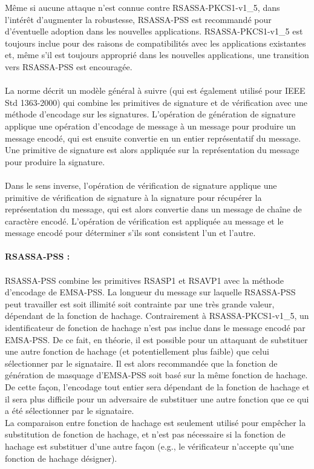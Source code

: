 Même si aucune attaque n'est connue contre RSASSA-PKCS1-v1\_5, dans l'intérêt d'augmenter la robustesse, RSASSA-PSS est recommandé pour d'éventuelle adoption dans les nouvelles applications. RSASSA-PKCS1-v1\_5 est toujours inclue pour des raisons de compatibilités avec les applications existantes et, même s'il est toujours approprié dans les nouvelles applications, une transition vers RSASSA-PSS est encouragée.
\\ \\
La norme décrit un modèle général à suivre (qui est également utilisé pour IEEE Std 1363-2000) qui combine les primitives de signature et de vérification avec une méthode d'encodage sur les signatures. L'opération de génération de signature applique une opération d'encodage de message à un message pour produire un message encodé, qui est ensuite convertie en un entier représentatif du message. Une primitive de signature est alors appliquée sur la représentation du message pour produire la signature.
\\ \\
Dans le sens inverse, l'opération de vérification de signature applique une primitive de vérification de signature à la signature pour récupérer la représentation du message, qui est alors convertie dans un message de chaîne de caractère encodé. L'opération de vérification est appliquée au message et le message encodé pour déterminer s'ils sont consistent l'un et l'autre.
\\ \\
\textbf{RSASSA-PSS : }
\\ \\
RSASSA-PSS combine les primitives RSASP1 et RSAVP1 avec la méthode d'encodage de EMSA-PSS. La longueur du message sur laquelle RSASSA-PSS peut travailler est soit illimité soit contrainte par une très grande valeur, dépendant de la fonction de hachage. Contrairement à RSASSA-PKCS1-v1\_5, un identificateur de fonction de hachage n'est pas inclue dans le message encodé par EMSA-PSS. De ce fait, en théorie, il est possible pour un attaquant de substituer une autre fonction de hachage (et potentiellement plus faible) que celui sélectionner par le signataire. Il est alors recommandée que la fonction de génération de masquage d'EMSA-PSS  soit basé sur la même fonction de hachage. De cette façon, l'encodage tout entier sera dépendant de la fonction de hachage et il sera plus difficile pour un adversaire de substituer une autre fonction que ce qui a été sélectionner par le signataire.
\\
La comparaison entre fonction de hachage est seulement utilisé pour empêcher la substitution de fonction de hachage, et n'est pas nécessaire si la fonction de hachage est substituer d'une autre façon (e.g., le vérificateur n'accepte qu'une fonction de hachage désigner).
